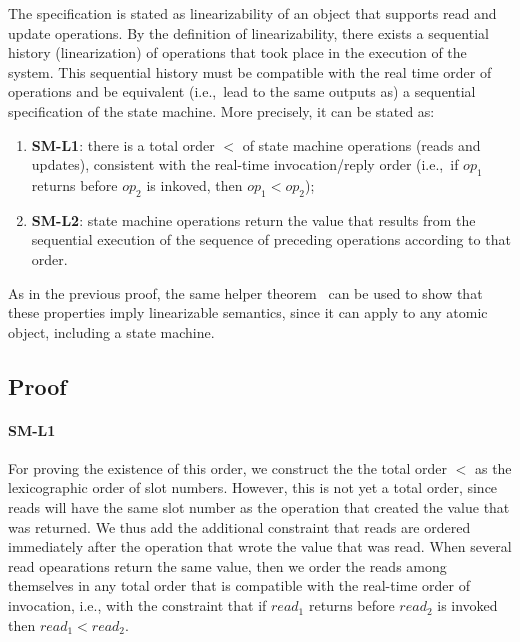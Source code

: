 The specification is stated as linearizability of an object that
supports read and update operations. By the definition of
linearizability, there exists a sequential history
(linearization) of operations that took place in the execution of
the system. This sequential history must be compatible with the
real time order of operations and be equivalent (i.e.,\ lead to
the same outputs as) a sequential specification of the state machine.
More precisely,
it can be stated as:

\begin{enumerate}
    \item [] \textbf{SM-L1}: there is a total order $<$ of state machine operations
        (reads and updates), consistent with the real-time
        invocation/reply order (i.e.,\ if $op_1$ returns before
        $op_2$ is inkoved, then $op_1 < op_2$);

      \item [] \textbf{SM-L2}: state machine operations return the value that results from the
        sequential execution of the sequence of preceding operations
        according to that order.
\end{enumerate}

As in the previous proof, the same helper theorem~\cite{nancy-book} can
be used to show that these properties imply linearizable semantics, since
it can apply to any atomic object, including a state machine.


\subsection{Proof}


\paragraph{SM-L1}
For proving the existence of this order, we construct the
the total order $<$ as the lexicographic order of slot numbers.
However, this is not yet a total order, since reads will have the same
slot number as the operation that created the value that was returned. We
thus add the additional constraint that reads are ordered immediately
after the operation that wrote the value that was read. When several
read opearations return the same value, then we order the
reads among themselves in any total order that is compatible with the
real-time order of invocation, i.e., with the constraint that
if $read_1$ returns before $read_2$ is invoked then $read_1 < read_2$.

